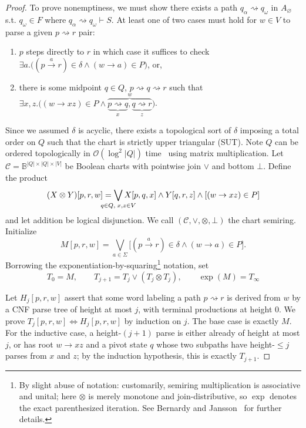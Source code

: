 \documentclass[popl.tex]{subfiles}
\begin{document}
\begin{proof}[Proof]
  To prove nonemptiness, we must show there exists a path $q_\alpha \rightsquigarrow q_\omega$ in $A_\varnothing$ s.t. $q_\omega\in F$ where $q_\alpha \rightsquigarrow q_\omega \vdash S$. At least one of two cases must hold for $w \in V$ to parse a given $p \rightsquigarrow r$ pair:

  \begin{enumerate}
    \item $p$ steps directly to $r$ in which case it suffices to check $\exists a.\big((p \overset{a}{\rightarrow} r)\in \delta \land (w \rightarrow a) \in P\big)$, or, \item there is some midpoint $q \in Q$, $p \rightsquigarrow q \rightsquigarrow r$ such that $\exists x, z.\big((w \rightarrow xz) \in P\land\overbrace{\underbrace{p \rightsquigarrow q}_x, \underbrace{q \rightsquigarrow r}_z}^w\big)$.
  \end{enumerate}

  \noindent Since we assumed \(\delta\) is acyclic, there exists a topological sort of \(\delta\) imposing a total order on \(Q\) such that the chart is strictly upper triangular (SUT). Note \(Q\) can be ordered topologically in \(\mathcal O(\log^2 |Q|)\) time~\cite{dekel1981parallel} using matrix multiplication. Let \(\mathcal C=\mathbb B^{|Q|\times |Q|\times |V|}\) be Boolean charts with pointwise join \(\vee\) and bottom \(\bot\). Define the product
  \[
    (X\otimes Y)[p,r,w]= \bigvee_{\mathclap{q\in Q,\;x,z\in V}} X[p,q,x]\land Y[q,r,z]\land[(w\to xz)\in P]
  \]
  and let addition be logical disjunction. We call \((\mathcal C,\vee,\otimes,\bot)\) the chart semiring. Initialize
  \[
    M[p,r,w]=
    \bigvee_{a\in\Sigma}
    \big[(p\xrightarrow{a}r)\in\delta\land(w\to a)\in P\big].
  \]
  Borrowing the exponentiation-by-squaring\footnote{By slight abuse of notation: customarily, semiring multiplication is associative and unital; here \(\otimes\) is merely monotone and join-distributive, so \(\exp\) denotes the exact parenthesized iteration. See Bernardy and Jansson~\cite{jansson2016certified} for further details.} notation, set
  \[
    T_0=M,\qquad T_{j+1}=T_j\vee(T_j\otimes T_j),\qquad \exp(M)=T_{\infty}
  \]

  Let \(H_j[p,r,w]\) assert that some word labeling a path \(p\rightsquigarrow r\) is derived from \(w\) by a CNF parse tree of height at most \(j\), with terminal productions at height \(0\). We prove \(T_j[p,r,w]\Leftrightarrow H_j[p,r,w]\) by induction on \(j\). The base case is exactly \(M\). For the inductive case, a height-\((j+1)\) parse is either already of height at most \(j\), or has root \(w\to xz\) and a pivot state \(q\) whose two subpaths have height-\(\le j\) parses from \(x\) and \(z\); by the induction hypothesis, this is exactly \(T_{j+1}\).


\end{proof}
\end{document}
